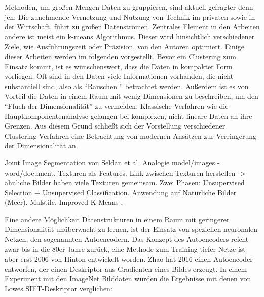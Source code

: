 Methoden, um großen Mengen Daten zu gruppieren, sind aktuell gefragter denn jeh: Die zunehmende Vernetzung und Nutzung von Technik im privaten sowie in der Wirtschaft, führt zu großen Datenströmen. Zentrales Element in den Arbeiten andere ist meist ein k-means Algorithmus. Dieser wird hinsichtlich verschiedener Ziele, wie Ausführungszeit oder Präzision, von den Autoren optimiert.  Einige dieser Arbeiten werden im folgenden vorgestellt.\newline
Bevor ein Clustering zum Einsatz kommt, ist es wünschenswert, dass die Daten in kompakter Form vorliegen. Oft sind in den Daten viele Informationen vorhanden, die nicht substantiell sind, also als \enquote{Rauschen } betrachtet werden. Außerdem ist es von Vorteil die Daten in einem Raum mit wenig Dimensionen zu beschreiben, um den \enquote{Fluch der Dimensionalität} zu vermeiden. Klassische Verfahren wie die Hauptkomponentenanalyse gelangen bei komplexen, nicht lineare Daten an ihre Grenzen. Aus diesem Grund schließt sich der Vorstellung verschiedener Clustering-Verfahren eine Betrachtung von modernen Ansätzen zur Verringerung der Dimensionalität an.\newline

Joint Image Segmentation von Seldan \cite{jis2003} et al. Analogie model/images - word/document. Texturen als Features. Link zwischen Texturen herstellen -> ähnliche Bilder haben viele Texturen gemeinsam. Zwei Phasen: Unsupervised Selection + Unsupervised Classification. Anwendung auf Natürliche Bilder (Meer), Malstile.\newline
Improved K-Means \cite{ikm2010}. %


Eine andere Möglichkeit Datenstrukturen in einem Raum mit geringerer Dimensionalität unüberwacht zu lernen, ist der Einsatz von speziellen neuronalen Netzen, den sogenannten Autoencodern. Das Konzept des Autoencoders reicht zwar bis in die 80er Jahre zurück, eine Methode zum Training tiefer Netze ist aber erst 2006 von Hinton \cite{dae2006} entwickelt worden. Zhao \cite{aed2016} hat 2016 einen Autoencoder entworfen, der einen Deskriptor aus Gradienten eines Bildes erzeugt. In einem Experiment mit den ImageNet Bilddaten wurden die Ergebnisse mit denen von Lowes SIFT-Deskriptor verglichen: 

